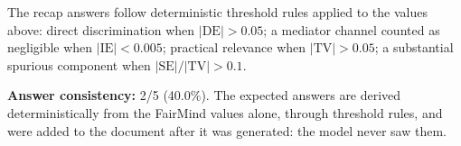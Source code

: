 \documentclass[11pt]{article}
\begin{document}
\vspace{1em}
\noindent\footnotesize
The recap answers follow deterministic threshold rules applied to the values above: direct discrimination when $|\mathrm{DE}| > 0.05$; a mediator channel counted as negligible when $|\mathrm{IE}| < 0.005$; practical relevance when $|\mathrm{TV}| > 0.05$; a substantial spurious component when $|\mathrm{SE}| / |\mathrm{TV}| > 0.1$.


\vspace{1em}
\noindent\textbf{Answer consistency:} 2/5 (40.0\%). The expected answers are derived deterministically from the FairMind values alone, through threshold rules, and were added to the document after it was generated: the model never saw them.
\end{document}
